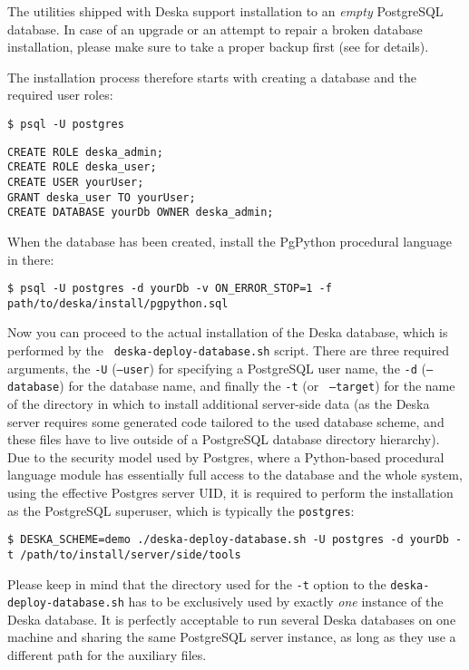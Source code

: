 \documentclass[deska]{subfiles}
\begin{document}
The utilities shipped with Deska support installation to an {\em empty} PostgreSQL database.  In case of an upgrade or
an attempt to repair a broken database installation, please make sure to take a proper backup first (see
 for details).

The installation process therefore starts with creating a database and the required user roles:

\begin{verbatim}
$ psql -U postgres
\end{verbatim}
\begin{verbatim}
CREATE ROLE deska_admin;
CREATE ROLE deska_user;
CREATE USER yourUser;
GRANT deska_user TO yourUser;
CREATE DATABASE yourDb OWNER deska_admin;
\end{verbatim}

When the database has been created, install the PgPython procedural language in there:

\begin{verbatim}
$ psql -U postgres -d yourDb -v ON_ERROR_STOP=1 -f path/to/deska/install/pgpython.sql
\end{verbatim}

Now you can proceed to the actual installation of the Deska database, which is performed by the {\tt
deska-deploy-database.sh} script.  There are three required arguments, the {\tt -U} ({\tt --user}) for specifying a
PostgreSQL user name, the {\tt -d} ({\tt --database}) for the database name, and finally the {\tt -t} (or {\tt
--target}) for the name of the directory in which to install additional server-side data (as the Deska server requires
some generated code tailored to the used database scheme, and these files have to live outside of a PostgreSQL database
directory hierarchy).  Due to the security model used by Postgres, where a Python-based procedural language module has
essentially full access to the database and the whole system, using the effective Postgres server UID, it is required to
perform the installation as the PostgreSQL superuser, which is typically the {\tt postgres}:

\begin{verbatim}
$ DESKA_SCHEME=demo ./deska-deploy-database.sh -U postgres -d yourDb -t /path/to/install/server/side/tools
\end{verbatim}

Please keep in mind that the directory used for the {\tt -t} option to the {\tt deska-deploy-database.sh} has to be
exclusively used by exactly {\em one} instance of the Deska database.  It is perfectly acceptable to run several Deska
databases on one machine and sharing the same PostgreSQL server instance, as long as they use a different path for the
auxiliary files.
\end{document}
